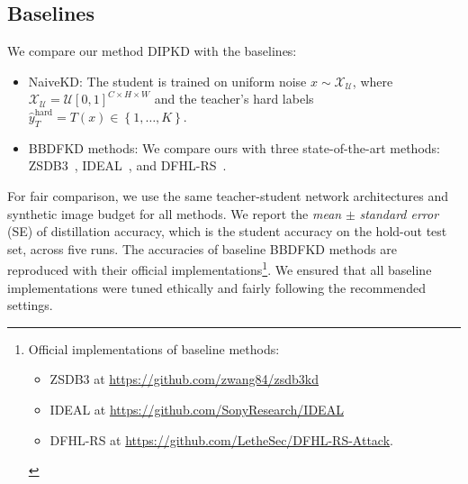 \subsection{Baselines} \label{ch4:ssec:04-experiments-baselines}
\begin{foldable}
    We compare our method DIPKD with the baselines:
    \begin{itemize}
        \item NaiveKD: The student is trained on uniform noise $x\sim\mathcal{X_{\mathcal{U}}}$, where $\mathcal{X}_{\mathcal{U}}=\mathcal{U}\left[0,1\right]^{C\times H\times W}$ and the teacher's hard labels $\hat{y}_{T}^\text{hard}=T\left(x\right)\in\left\{ 1,\ldots,K\right\}$.
        \item BBDFKD methods: We compare ours with three state-of-the-art methods: ZSDB3~\cite{wang2021zero}, IDEAL~\cite{zhang2022ideal}, and DFHL-RS~\cite{yuan2024data}.
    \end{itemize}
    For fair comparison, we use the same teacher-student network architectures and synthetic image budget for all methods.
    We report the \textit{mean} $\pm$ \textit{standard error} (SE) of distillation accuracy, which is the student accuracy on the hold-out test set, across five runs.
    The accuracies of baseline BBDFKD methods are reproduced with their official implementations\footnote{
        Official implementations of baseline methods:
        \begin{itemize}
            \item ZSDB3 at \url{https://github.com/zwang84/zsdb3kd}
            \item IDEAL at \url{https://github.com/SonyResearch/IDEAL}
            \item DFHL-RS at \url{https://github.com/LetheSec/DFHL-RS-Attack}.
        \end{itemize}
    }.
    We ensured that all baseline implementations were tuned ethically and fairly following the recommended settings.
\end{foldable}


